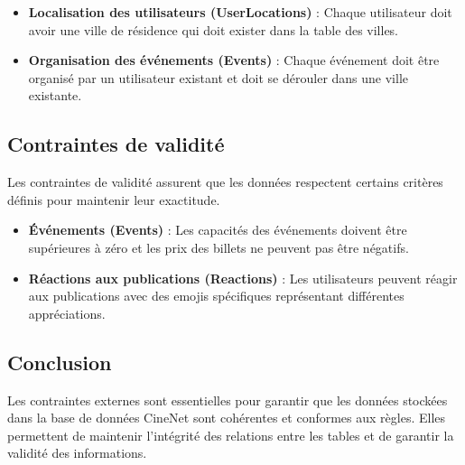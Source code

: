 \begin{itemize}
    \item \textbf{Localisation des utilisateurs (UserLocations)} : Chaque utilisateur doit avoir une ville de résidence qui doit exister dans la table des villes.
    \item \textbf{Organisation des événements (Events)} : Chaque événement doit être organisé par un utilisateur existant et doit se dérouler dans une ville existante.
\end{itemize}

\subsection*{Contraintes de validité}

Les contraintes de validité assurent que les données respectent certains critères définis pour maintenir leur exactitude.

\begin{itemize}
    \item \textbf{Événements (Events)} : Les capacités des événements doivent être supérieures à zéro et les prix des billets ne peuvent pas être négatifs.
    \item \textbf{Réactions aux publications (Reactions)} : Les utilisateurs peuvent réagir aux publications avec des emojis spécifiques représentant différentes appréciations.
\end{itemize}

\subsection*{Conclusion}

Les contraintes externes sont essentielles pour garantir que les données stockées dans la base de données CineNet sont cohérentes et conformes aux règles. Elles permettent de maintenir l'intégrité des relations entre les tables et de garantir la validité des informations.
